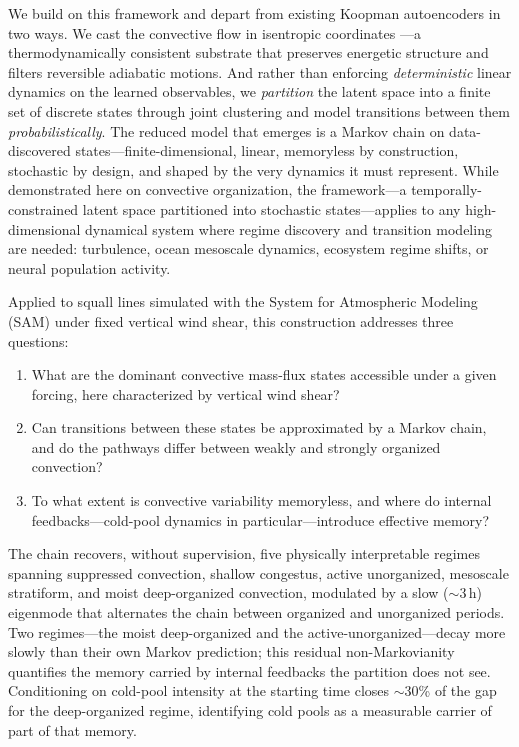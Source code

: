 \documentclass[11pt]{article}
\begin{document}
We build on this framework and depart from existing Koopman autoencoders in two ways. We cast the convective flow in isentropic coordinates \citep{pauluis2013isentropic}---a thermodynamically consistent substrate that preserves energetic structure and filters reversible adiabatic motions. And rather than enforcing \emph{deterministic} linear dynamics on the learned observables, we \emph{partition} the latent space into a finite set of discrete states through joint clustering \citep{kaiser2014cluster, souza2024representing} and model transitions between them \emph{probabilistically}. The reduced model that emerges is a Markov chain on data-discovered states---finite-dimensional, linear, memoryless by construction, stochastic by design, and shaped by the very dynamics it must represent. While demonstrated here on convective organization, the framework---a temporally-constrained latent space partitioned into stochastic states---applies to any high-dimensional dynamical system where regime discovery and transition modeling are needed: turbulence, ocean mesoscale dynamics, ecosystem regime shifts, or neural population activity.

Applied to squall lines simulated with the System for Atmospheric Modeling (SAM) under fixed vertical wind shear, this construction addresses three questions:
\begin{enumerate}
\item[(i)] What are the dominant convective mass-flux states accessible under a given forcing, here characterized by vertical wind shear?
\item[(ii)] Can transitions between these states be approximated by a Markov chain, and do the pathways differ between weakly and strongly organized convection?
\item[(iii)] To what extent is convective variability memoryless, and where do internal feedbacks---cold-pool dynamics in particular---introduce effective memory?
\end{enumerate}

The chain recovers, without supervision, five physically interpretable regimes spanning suppressed convection, shallow congestus, active unorganized, mesoscale stratiform, and moist deep-organized convection, modulated by a slow ($\sim$3\,h) eigenmode that alternates the chain between organized and unorganized periods. Two regimes---the moist deep-organized and the active-unorganized---decay more slowly than their own Markov prediction; this residual non-Markovianity quantifies the memory carried by internal feedbacks the partition does not see. Conditioning on cold-pool intensity at the starting time closes $\sim$30\% of the gap for the deep-organized regime, identifying cold pools as a measurable carrier of part of that memory.
\end{document}

